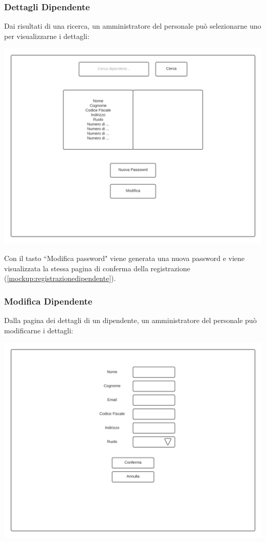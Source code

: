 \documentclass[12pt]{article}
\begin{document}
\newpage

\subsubsection{Dettagli Dipendente}
Dai risultati di una ricerca, un amministratore del personale può selezionarne uno per visualizzarne i dettagli:

\begin{center}
\includegraphics[height=0.3\textheight]{Mockup/AmministratorePersonale/Dettagli}
\end{center}

Con il tasto ``Modifica password" viene generata una nuova password e viene visualizzata la stessa pagina di conferma della registrazione (\ref{mockup:registrazionedipendente}).


\subsubsection{Modifica Dipendente}
Dalla pagina dei dettagli di un dipendente, un amministratore del personale può modificarne i dettagli:

\begin{center}
\includegraphics[height=0.3\textheight]{Mockup/AmministratorePersonale/Registrazione}
\end{center}

\newpage

\newpage

\end{document}
